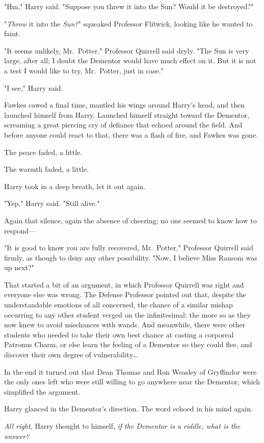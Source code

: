 "Hm," Harry said. "Suppose you threw it into the Sun? Would it be destroyed?"

"\emph{Throw} it into the \emph{Sun?}" squeaked Professor Flitwick, looking 
like he wanted to faint.

"It seems unlikely, Mr.~Potter," Professor Quirrell said dryly. "The Sun is 
very large, after all; I doubt the Dementor would have much effect on it. But 
it is not a test I would like to try, Mr.~Potter, just in case."

"I see," Harry said.

Fawkes cawed a final time, mantled his wings around Harry's head, and then 
launched himself from Harry. Launched himself straight toward the Dementor, 
screaming a great piercing cry of defiance that echoed around the field. And 
before anyone could react to that, there was a flash of fire, and Fawkes was 
gone.

The peace faded, a little.

The warmth faded, a little.

Harry took in a deep breath, let it out again.

"Yep," Harry said. "Still alive."

Again that silence, again the absence of cheering; no one seemed to know how to 
respond---

"It is good to know you are fully recovered, Mr.~Potter," Professor Quirrell 
said firmly, as though to deny any other possibility. "Now, I believe Miss 
Ransom was up next?"

That started a bit of an argument, in which Professor Quirrell was right and 
everyone else was wrong. The Defense Professor pointed out that, despite the 
understandable emotions of all concerned, the chance of a similar mishap 
occurring to any other student verged on the infinitesimal; the more so as they 
now knew to avoid mischances with wands. And meanwhile, there were other 
students who needed to take their own best chance at casting a corporeal 
Patronus Charm, or else learn the feeling of a Dementor so they could flee, and 
discover their own degree of vulnerability{\ldots}

In the end it turned out that Dean Thomas and Ron Weasley of Gryffindor were 
the only ones left who were still willing to go anywhere near the Dementor, 
which simplified the argument.

Harry glanced in the Dementor's direction. The word echoed in his mind again.

\emph{All right,} Harry thought to himself, \emph{if the Dementor is a riddle, 
what is the answer?}

